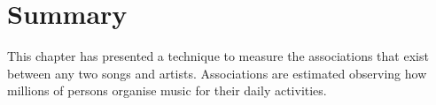 % 
% 
% 
% 
% 
% 
% 
% 
% 
% 



\section{Summary} %
\label{sub:summing_up3}

This chapter has presented a technique to measure the associations that exist between any two songs and artists.
Associations are estimated observing how millions of persons organise music for their daily activities.

